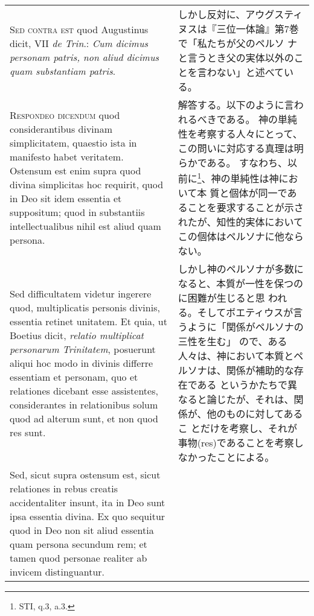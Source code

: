 \documentclass[10pt]{jsarticle} %
\begin{document}
\begin{longtable}{p{21em}p{21em}}
\\



{\scshape Sed contra est} quod Augustinus dicit, VII {\itshape de
 Trin}.: {\itshape Cum dicimus personam
patris, non aliud dicimus quam substantiam patris}.


&

しかし反対に、アウグスティヌスは『三位一体論』第7巻で「私たちが父のペルソ
 ナと言うとき父の実体以外のことを言わない」と述べている。


\\



{\scshape Respondeo dicendum} quod considerantibus divinam simplicitatem, quaestio
ista in manifesto habet veritatem. Ostensum est enim supra quod divina
simplicitas hoc requirit, quod in Deo sit idem essentia et suppositum;
quod in substantiis intellectualibus nihil est aliud quam persona. 


&

解答する。以下のように言われるべきである。
神の単純性を考察する人々にとって、この問いに対応する真理は明らかである。
 すなわち、以前に\footnote{STI, q.3, a.3.}、神の単純性は神において本
 質と個体が同一であることを要求することが示されたが、知性的実体において
 この個体はペルソナに他ならない。


\\

Sed
difficultatem videtur ingerere quod, multiplicatis personis divinis,
essentia retinet unitatem. 
Et quia, ut Boetius dicit, {\itshape relatio
multiplicat personarum Trinitatem}, posuerunt aliqui hoc modo in divinis
differre essentiam et personam, quo et relationes dicebant esse
assistentes, considerantes in relationibus solum quod ad alterum sunt,
et non quod res sunt. 


&

しかし神のペルソナが多数になると、本質が一性を保つのに困難が生じると思
 われる。そしてボエティウスが言うように「関係がペルソナの三性を生む」
 ので、ある人々は、神において本質とペルソナは、関係が補助的な存在である
 というかたちで異なると論じたが、それは、関係が、他のものに対してあるこ
 とだけを考察し、それが事物(res)であることを考察しなかったことによる。



\\

Sed, sicut supra ostensum est, sicut relationes in
rebus creatis accidentaliter insunt, ita in Deo sunt ipsa essentia
divina. 
Ex quo sequitur quod in Deo non sit aliud essentia quam persona
secundum rem; et tamen quod personae realiter ab invicem
distinguantur. 


\end{longtable}
\end{document}

